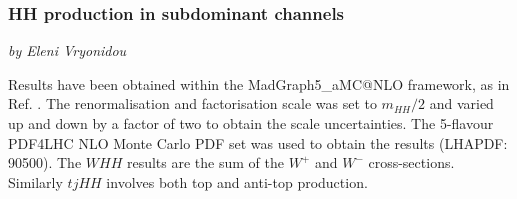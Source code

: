 \subsubsection{HH production in subdominant channels}
\begin{center}
    \textit{by Eleni Vryonidou}
\end{center}

\begin{table}[h!]
\renewcommand{\arraystretch}{1.6}
\begin{center}
 \label{table:xsec2}
 \caption{Signal cross section (in fb) for HH production at NLO QCD.}  
\end{center} 
\end{table}
Results have been obtained within the {\sc MadGraph5\_aMC@NLO} \cite{Alwall:2014hca} framework, as in Ref. \cite{Frederix:2014hta}. The renormalisation and factorisation scale was set to $m_{HH}/2$ and varied up and down by a factor of two to obtain the scale uncertainties. The 5-flavour PDF4LHC NLO Monte Carlo PDF set was used to obtain the results (LHAPDF: 90500). The $WHH$ results are the sum of the $W^+$ and $W^-$ cross-sections. Similarly $tjHH$ involves both top and anti-top production. 